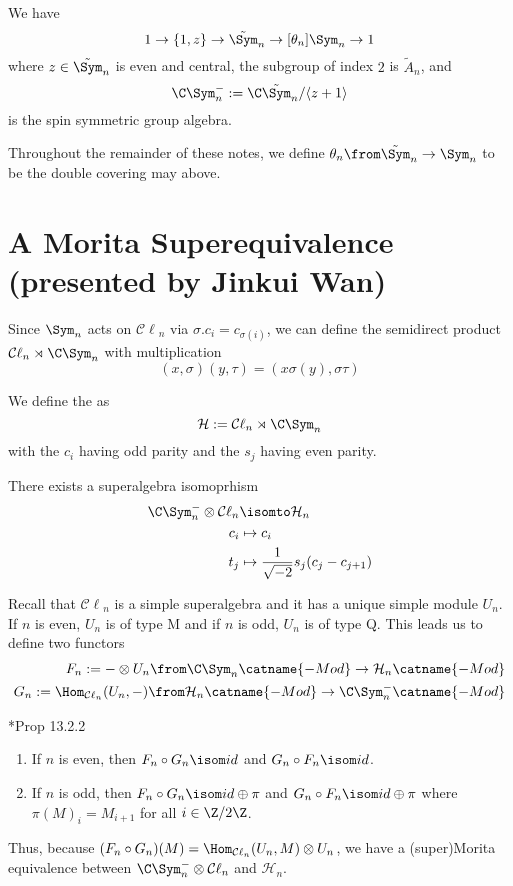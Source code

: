 \documentclass[11pt,leqno,oneside]{amsbook}
\renewcommand{\H}{\mathcal{H}}
\newcommand{\Cl}{\mathcal{C\ell}} %
\numberwithin{thm}{section}
\begin{document}
\begin{example}
  We have \[
    1 \to \{1,z\} \to \tilde{\Sym}_n \to[\theta_n] \Sym_n \to 1
  \]
  where \(z \in \tilde{\Sym}_n\) is even and central, the subgroup of
  index \(2\) is \(\tilde{A}_n\), and \[
    \C\Sym_n^- := \C \tilde{\Sym}_n/\langle z+1 \rangle
  \]
  is the spin symmetric group algebra.
\end{example}
\begin{defn}
  Throughout the remainder of these notes, we define \(\theta_n \from
  \tilde{\Sym}_n \to \Sym_n\) to be the double covering may above.
\end{defn}
\section{A Morita Superequivalence (presented by Jinkui Wan)}
Since \(\Sym_n\) acts on \(\Cl_n\) via \(\sigma.c_i = c_{\sigma(i)}\),
we can define the semidirect product \(\Cl_n \rtimes \C \Sym_n\) with
multiplication \[
  (x,\sigma)(y,\tau) = (x \sigma(y), \sigma \tau)
\]
\begin{defn}
  We define the  as \[
    \H := \Cl_n \rtimes \C \Sym_n
  \]
  with the \(c_i\) having odd parity and the \(s_j\) having even
  parity. 
\end{defn}
\begin{lem}
  There exists a superalgebra isomoprhism
  \begin{align*}
    \C\Sym_n^- \otimes \Cl_n & \isomto \H_n\\
    c_i & \mapsto c_i \\
    t_j & \mapsto \frac{1}{\sqrt{-2}} s_j(c_j-c_{j+1})
  \end{align*}
\end{lem}
Recall that \(\Cl_n\) is a simple superalgebra and it has a unique
simple module \(U_n\). If \(n\) is even, \(U_n\) is of type M and
if \(n\) is odd, \(U_n\) is of type Q. This leads us to define two
functors
\begin{align*}
  F_n := - \otimes U_n \from \C\Sym_n\catname{-Mod} \to
  \H_n\catname{-Mod}\\
  G_n := \Hom_{\Cl_n}(U_n,-) \from \H_n\catname{-Mod} \to \C\Sym_n^-\catname{-Mod}
\end{align*}
\begin{lem}
  \cite{kleshchev}*{Prop 13.2.2}
  \begin{enumerate}
  \item If \(n\) is even, then \(F_n \circ G_n \isom id\) and \(G_n
    \circ F_n \isom id\).
  \item If \(n\) is odd, then \(F_n \circ G_n \isom id \oplus \pi\)
    and \(G_n \circ F_n \isom id \oplus \pi\) where \(\pi(M)_i =
    M_{i+1}\) for all \(i \in \Z/2\Z\). 
  \end{enumerate}
\end{lem}
Thus, because \((F_n \circ G_n)(M) = \Hom_{\Cl_n}(U_n,M) \otimes
U_n\), we have a (super)Morita equivalence between \(\C\Sym_n^-
\otimes \Cl_n\) and \(\H_n\).
\end{document}

